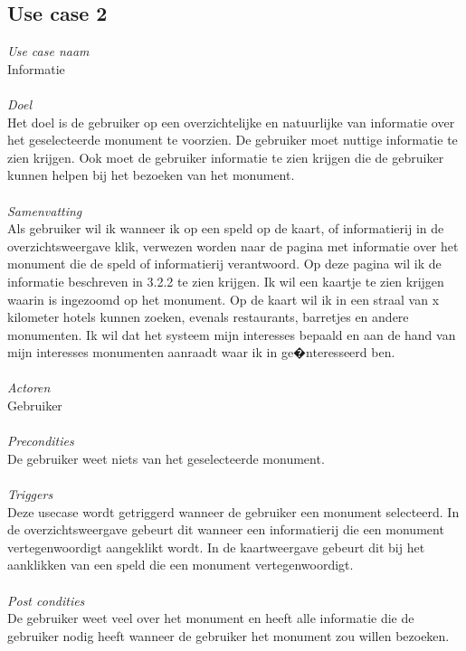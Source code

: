\documentclass[a4paper,10pt]{article}
\begin{document}
		\subsection{Use case 2}
			\textit{Use case naam}\\
			Informatie\\ \\
			\textit{Doel}\\
			Het doel is de gebruiker op een overzichtelijke en natuurlijke van informatie over het geselecteerde monument te voorzien. De gebruiker moet nuttige informatie te zien krijgen. Ook moet de gebruiker informatie te zien krijgen die de gebruiker kunnen helpen bij het bezoeken van het monument.\\ \\
			\textit{Samenvatting}\\
			Als gebruiker wil ik wanneer ik op een speld op de kaart, of informatierij in de overzichtsweergave klik, verwezen worden naar de pagina met informatie over het monument die de speld of informatierij verantwoord. Op deze pagina wil ik de informatie beschreven in 3.2.2 te zien krijgen. Ik wil een kaartje te zien krijgen waarin is ingezoomd op het monument. Op de kaart wil ik in een straal van x kilometer hotels kunnen zoeken, evenals restaurants, barretjes en andere monumenten. Ik wil dat het systeem mijn interesses bepaald en aan de hand van mijn interesses monumenten aanraadt waar ik in ge�nteresseerd ben.\\ \\
			\textit{Actoren}\\
			Gebruiker\\ \\
			\textit{Precondities}\\
			De gebruiker weet niets van het geselecteerde monument.\\ \\
			\textit{Triggers}\\
			Deze usecase wordt getriggerd wanneer de gebruiker een monument selecteerd. In de overzichtsweergave gebeurt dit wanneer een informatierij die een monument vertegenwoordigt aangeklikt wordt. In de kaartweergave gebeurt dit bij het aanklikken van een speld die een monument vertegenwoordigt.\\ \\
			\textit{Post condities}\\
			De gebruiker weet veel over het monument en heeft alle informatie die de gebruiker nodig heeft wanneer de gebruiker het monument zou willen bezoeken.
		
\end{document}
